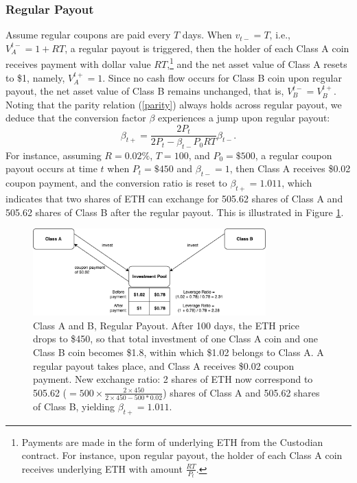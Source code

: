 \documentclass[draft, noinfoline]{ectaart}
\numberwithin{equation}{section}
\theoremstyle{plain}
\begin{document}
\subsubsection{Regular Payout}
Assume regular coupons are paid every $T$ days. When $v_{t-}=T$, i.e., $V_{A}^{t-}=1+RT$, a regular payout is triggered, then the holder of each Class A coin receives payment with dollar value $RT$,\footnote{Payments are made in the form of underlying ETH from the Custodian contract. For instance, upon regular payout, the holder of each Class A coin receives underlying ETH with amount $\frac{RT}{P_{t}}$.}
 and the net asset value of Class A resets to \$1, namely, $V_{A}^{t+}=1$. Since no cash flow occurs for Class B coin upon regular payout, the net asset value of Class B remains unchanged, that is, $V_{B}^{t-}=V_{B}^{t+}$. Noting that the parity relation (\ref{parity}) always holds across regular payout, we deduce that the conversion factor $\beta$ experiences a jump upon regular payout:
 $$\beta_{t+}=\frac{2P_{t}}{2P_{t}-\beta_{t-}P_{0} RT}\beta_{t-}.$$
 For instance, assuming $R=0.02\%$, $T=100$, and $P_0=\$500$, a regular coupon payout occurs at time $t$ when $P_t=\$450$ and $\beta_{t-}=1$, then Class A receives \$0.02 coupon payment, and the conversion ratio is reset to $\beta_{t+}=1.011$, which indicates that two shares of ETH can exchange for 505.62 shares of Class A and 505.62 shares of Class B after the regular payout. This is illustrated in Figure \ref{fig:regular}.


\begin{figure}[!htb]
	\centering
	\includegraphics[width=0.8\textwidth]{periodic}
	\caption{Class A and B, Regular Payout. After 100 days, the ETH price drops to \$450, so that total investment of one Class A coin and one Class B coin becomes \$1.8, within which \$1.02 belongs to Class A. A regular payout takes place, and Class A receives \$0.02 coupon payment. New exchange ratio: 2 shares of ETH now correspond to 505.62 ($=500\times\frac{2\times450}{2\times450-500*0.02}$) shares of Class A and 505.62 shares of Class B, yielding $\beta_{t+}=1.011$.}\label{fig:regular}
\end{figure}
\end{document}
